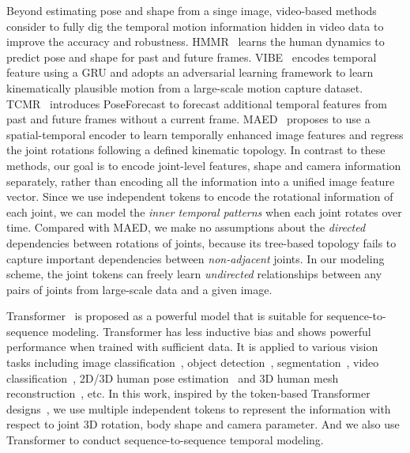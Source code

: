Beyond estimating pose and shape from a singe image, video-based methods consider to fully dig the temporal motion information hidden in video data to improve the accuracy and robustness.  HMMR~\citep{hmmr:kanazawa2019learning} learns the human dynamics to predict pose and shape for past and future frames. 
VIBE~\citep{vibe:kocabas2020vibe} encodes temporal feature using a GRU and adopts an adversarial learning framework to learn kinematically plausible motion from a large-scale motion capture dataset.
TCMR~\citep{tcmr:choi2021beyond} introduces PoseForecast to forecast additional temporal features from past and future frames without a current frame. 
MAED~\citep{maed:wan2021encoder} proposes to use a spatial-temporal encoder to learn temporally enhanced image features and regress the joint rotations following a defined kinematic topology.
In contrast to these methods, our goal is to encode joint-level features, shape and camera information separately, rather than encoding all the information into a unified image feature vector.  
Since we use independent tokens to encode the rotational information of each joint, we can model the \textit{inner temporal patterns} when each joint rotates over time. 
Compared with MAED, we make no assumptions about the \textit{directed} dependencies between rotations of joints, because its tree-based topology fails to capture important dependencies between \textit{non-adjacent} joints.
In our modeling scheme, the joint tokens can freely learn \textit{undirected} relationships between any pairs of joints from large-scale data and a given image. 


Transformer~\citep{transformer:vaswani2017attention} is proposed as a powerful model that is suitable for sequence-to-sequence modeling. 
Transformer has less inductive bias and shows powerful performance when trained with sufficient data. 
It is applied to various vision tasks including image classification~\citep{vit:dosovitskiy2020image, deit:touvron2021training, swin:liu2021swin}, object detection~\citep{detr:carion2020end, pix2seq:chen2021pix2seq}, segmentation~\citep{vistr:wang2021end, segformer:xie2021segformer}, video classification~\citep{vivit:arnab2021vivit}, 2D/3D human pose estimation~\citep{transpose:yang2021transpose, tokenpose:li2021tokenpose, li2021pose, hrformer:yuan2021hrformer, yang2021attend, mao2022poseur, zheng20213d} and 3D human mesh reconstruction~\citep{metro:lin2021end, meshgrahormer:lin2021mesh, maed:wan2021encoder}, etc. In this work, inspired by the token-based Transformer designs~\citep{bert:devlin2018bert,vit:dosovitskiy2020image,tokenpose:li2021tokenpose}, we use multiple independent tokens to represent the information with respect to joint 3D rotation, body shape and camera parameter. And we also use Transformer to conduct sequence-to-sequence temporal modeling.  

